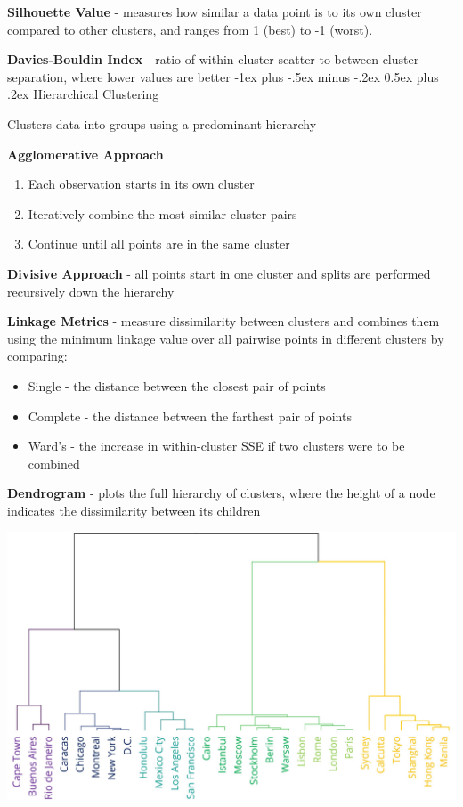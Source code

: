 \documentclass[10pt,landscape]{article}
\makeatletter
\renewcommand{\subsection}{\@startsection{subsection}{2}{0mm}%
                                {-1ex plus -.5ex minus -.2ex}%
                                {0.5ex plus .2ex}%
                                {\normalfont\normalsize\bfseries}}
\makeatother
\begin{document}
\begin{multicols}{3}
    \textbf{Silhouette Value} - measures how similar a data point is to its own cluster compared to other clusters, and ranges from 1 (best) to -1 (worst).

    \textbf{Davies-Bouldin Index} - ratio of within cluster scatter to between cluster separation, where lower values are better
    \subsection{Hierarchical Clustering}

    Clusters data into groups using a predominant hierarchy

    \textbf{Agglomerative Approach}
    \begin{enumerate}[leftmargin=5mm]
        \itemsep -.4mm
        \item Each observation starts in its own cluster
        \item Iteratively combine the most similar cluster pairs
        \item Continue until all points are in the same cluster
    \end{enumerate}

    \textbf{Divisive Approach} - all points start in one cluster and splits are performed recursively down the hierarchy

    \textbf{Linkage Metrics} - measure dissimilarity between clusters and combines them using the minimum linkage value over all pairwise points in different clusters by comparing:
    \begin{itemize}[label={--},leftmargin=4mm]
        \itemsep -.4mm
        \item Single - the distance between the closest pair of points
        \item Complete - the distance between the farthest pair of points
        \item Ward's - the increase in within-cluster SSE if two clusters were to be combined
    \end{itemize}
    \textbf{Dendrogram} - plots the full hierarchy of clusters, where the height of a node indicates the dissimilarity between its children
    \begin{center}
        \includegraphics[scale = .1]{images/dendroedit3.JPG}
    \end{center}


\end{multicols}
\end{document}
